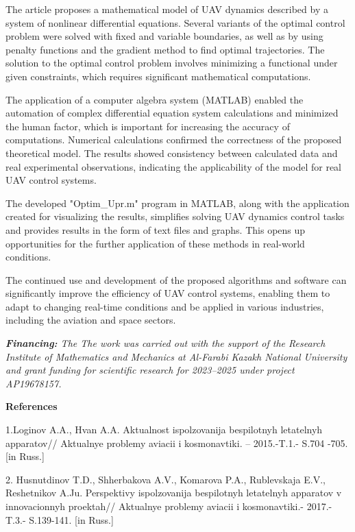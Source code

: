 The article proposes a mathematical model of UAV dynamics described by a
system of nonlinear differential equations. Several variants of the
optimal control problem were solved with fixed and variable boundaries,
as well as by using penalty functions and the gradient method to find
optimal trajectories. The solution to the optimal control problem
involves minimizing a functional under given constraints, which requires
significant mathematical computations.

The application of a computer algebra system (MATLAB) enabled the
automation of complex differential equation system calculations and
minimized the human factor, which is important for increasing the
accuracy of computations. Numerical calculations confirmed the
correctness of the proposed theoretical model. The results showed
consistency between calculated data and real experimental observations,
indicating the applicability of the model for real UAV control systems.

The developed "Optim\_Upr.m" program in MATLAB, along with the
application created for visualizing the results, simplifies solving UAV
dynamics control tasks and provides results in the form of text files
and graphs. This opens up opportunities for the further application of
these methods in real-world conditions.

The continued use and development of the proposed algorithms and
software can significantly improve the efficiency of UAV control
systems, enabling them to adapt to changing real-time conditions and be
applied in various industries, including the aviation and space sectors.

\emph{{\bfseries Financing:} The The work was carried out with the support
of the Research Institute of Mathematics and Mechanics at Al-Farabi
Kazakh National University and grant funding for scientific research for
2023--2025 under project AP19678157.}

{\bfseries References}

1.Loginov A.A., Hvan A.A. Aktual\textquotesingle nost\textquotesingle{}
ispol\textquotesingle zovanija bespilotnyh letatel\textquotesingle nyh
apparatov// Aktual\textquotesingle nye problemy aviacii i kosmonavtiki.
-- 2015.-T.1.- S.704 -705.{[}in Russ.{]}

2. Husnutdinov T.D., Shherbakova A.V., Komarova P.A., Rublevskaja E.V.,
Reshetnikov A.Ju. Perspektivy ispol\textquotesingle zovanija bespilotnyh
letatel\textquotesingle nyh apparatov v innovacionnyh proektah//
Aktual\textquotesingle nye problemy aviacii i kosmonavtiki.- 2017.-
T.3.- S.139-141. {[}in Russ.{]}

